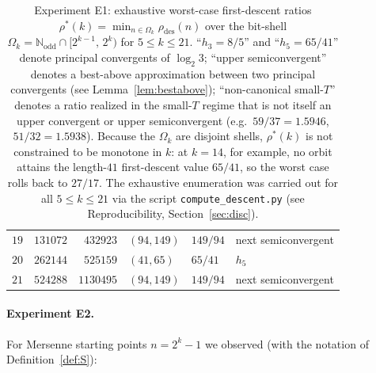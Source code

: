 \documentclass[11pt,a4paper]{article}
\theoremstyle{definition}
\theoremstyle{remark}
\newcommand{\N}{\mathbb{N}}
\newcommand{\Nodd}{\N_{\mathrm{odd}}}
\begin{document}
\begin{table}[htbp]
\begin{tabular}{r r r l l l}
$19$ & $131072$   & $432923$   & $(94,149)$ & $149/94$ & next semiconvergent \\
$20$ & $262144$   & $525159$   & $(41,65)$  & $65/41$  & $h_5$ \\
$21$ & $524288$   & $1130495$  & $(94,149)$ & $149/94$ & next semiconvergent \\
\bottomrule
\end{tabular}
\caption{Experiment E1: exhaustive worst-case first-descent ratios
$\rho^{*}(k) = \min_{n \in \Omega_k} \rho_{\mathrm{des}}(n)$ over the
bit-shell $\Omega_k = \Nodd \cap [2^{k-1},\, 2^k)$ for $5 \leq k \leq
21$.  ``$h_3 = 8/5$'' and ``$h_5 = 65/41$'' denote principal
convergents of $\log_2 3$; ``upper semiconvergent'' denotes a
best-above approximation between two principal convergents (see
Lemma~\ref{lem:bestabove}); ``non-canonical small-$T$'' denotes a
ratio realized in the small-$T$ regime that is not itself an
upper convergent or upper semiconvergent (e.g.\ $59/37 = 1.5946$,
$51/32 = 1.5938$).  Because the $\Omega_k$ are disjoint shells,
$\rho^{*}(k)$ is not constrained to be monotone in $k$: at $k = 14$,
for example, no orbit attains the length-$41$ first-descent value
$65/41$, so the worst case rolls back to $27/17$.  The exhaustive
enumeration was carried out for all $5 \leq k \leq 21$ via the
script \texttt{compute\_descent.py} (see Reproducibility,
Section~\ref{sec:disc}).}
\label{tab:E1}
\end{table}

\paragraph{Experiment E2.}
For Mersenne starting points $n = 2^k - 1$ we observed (with the
notation of Definition~\ref{def:S}):
\end{document}
